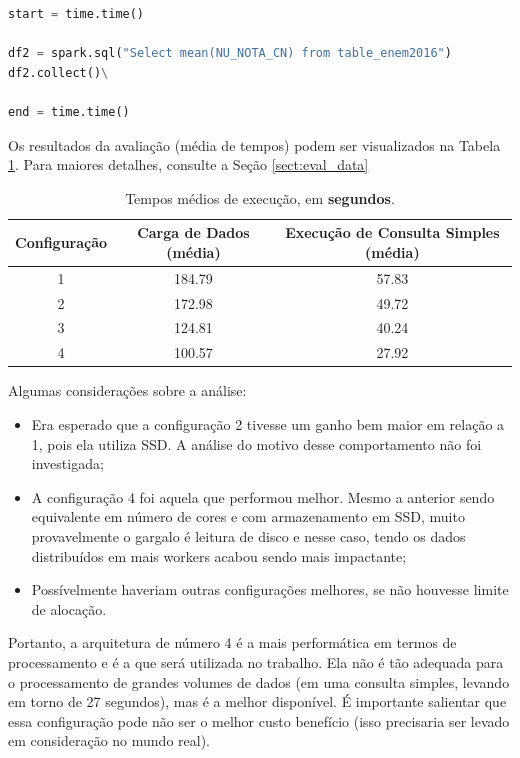 \documentclass{article}
\begin{document}
\begin{lstlisting}[caption= {Consulta Simplificada para Avaliação},captionpos=b, language=python]
start = time.time()

df2 = spark.sql("Select mean(NU_NOTA_CN) from table_enem2016")
df2.collect()\

end = time.time()
\end{lstlisting}

Os resultados da avaliação (média de tempos) podem ser visualizados na Tabela \ref{tab:mean_times}. Para maiores detalhes, consulte a Seção \ref{sect:eval_data}

\begin{table}[H]
\centering
\begin{tabular}{|c|c|c|}
\hline
Configuração & Carga de Dados (média) &  Execução de  Consulta Simples (média) \\ \hline 
\hline
1 & 184.79 &  57.83
\\ \hline
2 & 172.98 & 49.72
 \\ \hline
3 & 124.81
 &  40.24
 \\ \hline
4 & 100.57
 &  27.92
 \\ \hline
\end{tabular}
\caption{Tempos médios de execução, em \textbf{segundos}.}
\label{tab:mean_times}
\end{table}

Algumas considerações sobre a análise:

\begin{itemize}
    \item Era esperado que a configuração 2 tivesse um ganho bem maior em relação a 1, pois ela utiliza SSD. A análise do motivo desse comportamento não foi investigada;
    \item A configuração 4 foi aquela que performou melhor. Mesmo a anterior sendo equivalente em número de cores e com armazenamento em SSD, muito provavelmente o gargalo é leitura de disco e nesse caso, tendo os dados distribuídos em mais workers acabou sendo mais impactante;
    \item Possívelmente haveriam outras configurações melhores, se não houvesse limite de alocação.
\end{itemize}

Portanto, a arquitetura de número 4 é a mais performática em termos de processamento e é a que será utilizada no trabalho. Ela não é tão adequada para o processamento de grandes volumes de dados (em uma consulta simples, levando em torno de 27 segundos), mas é a melhor disponível. É importante salientar que essa configuração pode não ser o melhor custo benefício (isso precisaria ser levado em consideração no mundo real).
\end{document}
